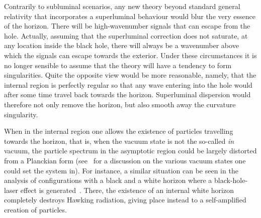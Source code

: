 \documentclass[12pt]{article}
\begin{document}
Contrarily to subluminal scenarios, any new theory beyond standard 
general relativity that incorporates a superluminal behaviour would 
blur the very essence of the horizon. There will be high-wavenumber 
signals that can escape from the hole. Actually, assuming that the 
superluminal correction does not saturate, at any location inside the 
black hole, there will always be a wavenumber above which the signals 
can escape towards the exterior. Under these circumstances it is no 
longer sensible to assume that the theory will have a tendency to form 
singularities. Quite the opposite view would be more reasonable, 
namely, that the internal region is perfectly regular so that any wave 
entering into the hole would after some time travel back towards the 
horizon. Superluminal dispersion would therefore not only remove the 
horizon, but also smooth away the curvature singularity.

When in the internal region one allows the existence of particles
travelling towards the horizon, that is, when the vacuum state is not
the so-called \emph{in} vacuum,  the particle spectrum  in the
asymptotic region could be largely distorted from a Planckian form 
(see~\cite{barcelo-vacuum-selection} for a discussion on the various vacuum
states one  could set the system in). For instance, a similar
situation can be seen in the analysis of  configurations with a black and a
white horizon  where a black-hole-laser effect is 
generated~\cite{corley-jacobson-lasers,parentani-finazzi,coutant,Leonhardt:2007zz}. There,  the existence of an
internal white horizon completely destroys Hawking radiation, giving place
instead to a self-amplified creation of particles. 
\end{document}

